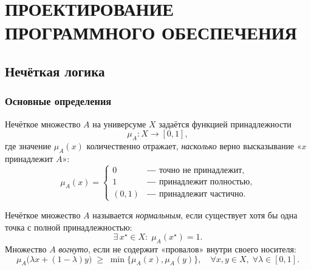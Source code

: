 \section{ПРОЕКТИРОВАНИЕ ПРОГРАММНОГО ОБЕСПЕЧЕНИЯ}
\eskdrerun{}


\subsection{Нечёткая логика}
\subsubsection{Основные определения}

\begin{definition}
Нечёткое множество $A$ на универсуме $X$ задаётся функцией принадлежности
\begin{equation}
  \mu_A\colon X \longrightarrow [0,1],
  \label{eq:fuzzy_set_def}
\end{equation}
где значение $\mu_A(x)$ количественно отражает,
\emph{насколько} верно высказывание «$x$ принадлежит $A$»:
\[
  \mu_A(x)=
  \begin{cases}
    0          &\text{― точно не принадлежит},\\
    1          &\text{― принадлежит полностью},\\
    (0,1)      &\text{― принадлежит частично}.
  \end{cases}
\]
\end{definition}

\begin{definition}
Нечёткое множество $A$ называется
\emph{нормальным}, если существует хотя бы одна точка
с полной принадлежностью:
\begin{equation}
  \exists\,x^\star\in X:\; \mu_A(x^\star)=1.
\end{equation}
Множество $A$ \emph{вогнуто}, если не содержит «провалов» внутри
своего носителя:
\begin{equation}
  \mu_A\!\bigl(\lambda x+(1-\lambda)y\bigr)\;\ge\;
  \min\{\mu_A(x),\mu_A(y)\},
  \quad \forall x,y\in X,\;\forall\lambda\in[0,1].
\end{equation}
\end{definition}


